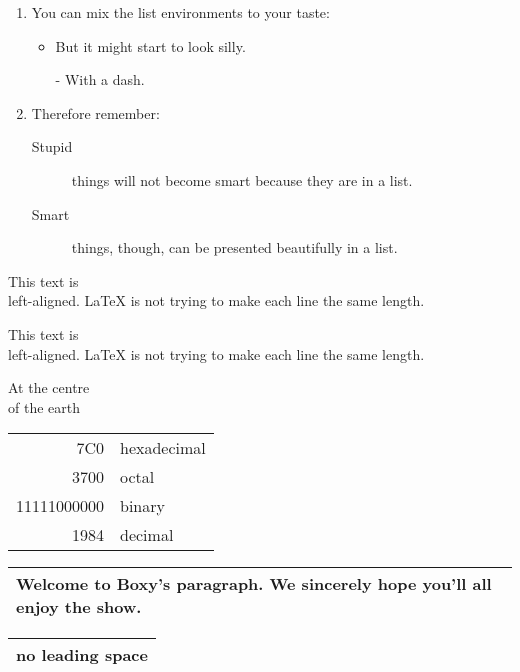 \documentclass[a4paper,11pt]{book}
\begin{document}
	\begin{enumerate}
		\item You can mix the list
		environments to your taste:
		\begin{itemize}
			\item But it might start to
			look silly.
			\item[-] With a dash.
		\end{itemize}
		\item Therefore remember:
		\begin{description}
			\item[Stupid] things will not
			become smart because they are
			in a list.
			\item[Smart] things, though,
			can be presented beautifully
			in a list.
		\end{description}
	\end{enumerate}
	
	
	\begin{flushright}
		This text is\\ left-aligned.
		\LaTeX{} is not trying to make
		each line the same length.
	\end{flushright}	

	\begin{flushleft}
	This text is\\ left-aligned.
	\LaTeX{} is not trying to make
	each line the same length.
	\end{flushleft}
	
	
	\begin{center}
		At the centre\\of the earth
	\end{center}
	
	
	\begin{tabular}{|r|l|}
		\hline
		7C0 & hexadecimal \\
		3700 & octal \\ \cline{2-2}
		11111000000 & binary \\
		\hline \hline
		1984 & decimal \\
		\hline
	\end{tabular}
	
	
	\begin{tabular}{|p{4.7cm}|}
		\hline
		Welcome to Boxy’s paragraph.
		We sincerely hope you’ll
		all enjoy the show.\\
		\hline
	\end{tabular}
	
	
	\begin{tabular}{@{} l @{}}
		\hline
		no leading space\\
		\hline
	\end{tabular}
	
\end{document}
